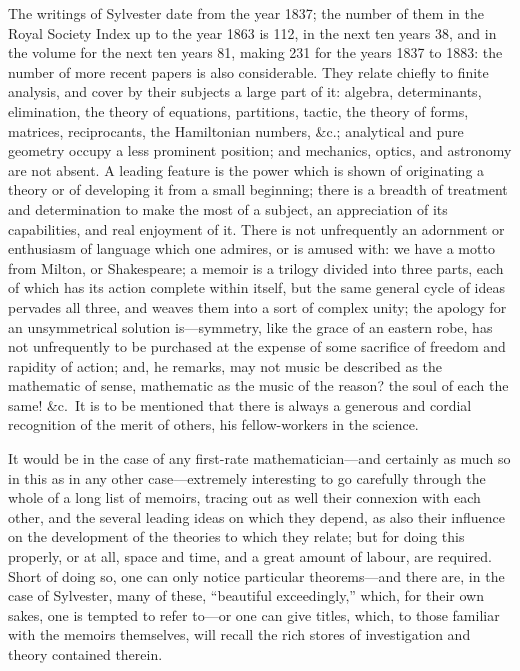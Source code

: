\documentclass[11pt,a4paper]{article}
\begin{document}
The writings of Sylvester date from the year 1837; the number of them in the Royal Society Index up to the year 1863 is 112, in the next ten years 38, and in the volume for the next ten years 81, making 231 for the years 1837 to 1883: the number of more recent papers is also considerable. They relate chiefly to finite analysis, and cover by their subjects a large part of it: algebra, determinants, elimination, the theory of equations, partitions, tactic, the theory of forms, matrices, reciprocants, the Hamiltonian numbers, \&c.; analytical and pure geometry occupy a less prominent position; and mechanics, optics, and astronomy are not absent. A leading feature is the power which is shown of originating a theory or of developing it from a small beginning; there is a breadth of treatment and determination to make the most of a subject, an appreciation of its capabilities, and real enjoyment of it. There is not unfrequently an adornment or enthusiasm of language which one admires, or is amused with: we have a motto from Milton, or Shakespeare; a memoir is a trilogy divided into three parts, each of which has its action complete within itself, but the same general cycle of ideas pervades all three, and weaves them into a sort of complex unity; the apology for an unsymmetrical solution is---symmetry, like the grace of an eastern robe, has not unfrequently to be purchased at the expense of some sacrifice of freedom and rapidity of action; and, he remarks, may not music be described as the mathematic of sense, mathematic as the music of the reason? the soul of each the same! \&c.\ It is to be mentioned that there is always a generous and cordial recognition of the merit of others, his fellow-workers in the science.

It would be in the case of any first-rate mathematician---and certainly as much so in this as in any other case---extremely interesting to go carefully through the whole of a long list of memoirs, tracing out as well their connexion with each other, and the several leading ideas on which they depend, as also their influence on the development of the theories to which they relate; but for doing this properly, or at all, space and time, and a great amount of labour, are required. Short of doing so, one can only notice particular theorems---and there are, in the case of Sylvester, many of these, ``beautiful exceedingly,'' which, for their own sakes, one is tempted to refer to---or one can give titles, which, to those familiar with the memoirs themselves, will recall the rich stores of investigation and theory contained therein.
\end{document}
